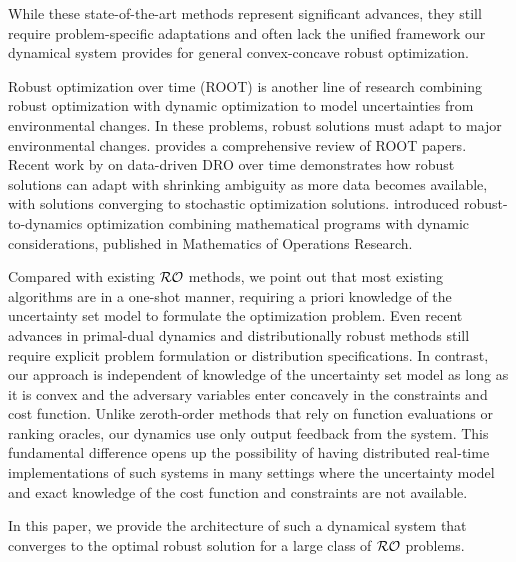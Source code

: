 \documentclass[journal,twoside,web]{ieeecolor}
\begin{document}
{While these state-of-the-art methods represent significant advances, they still require problem-specific adaptations and often lack the unified framework our dynamical system provides for general convex-concave robust optimization.}

{\color{blue} Robust optimization over time (ROOT) is another line of research combining robust optimization with dynamic optimization to model uncertainties from environmental changes. In these problems, robust solutions must adapt to major environmental changes. \cite{yazdani2023} provides a comprehensive review of ROOT papers. Recent work by \cite{aigner2023} on data-driven DRO over time demonstrates how robust solutions can adapt with shrinking ambiguity as more data becomes available, with solutions converging to stochastic optimization solutions. \cite{robusttodynamics2024} introduced robust-to-dynamics optimization combining mathematical programs with dynamic considerations, published in Mathematics of Operations Research.}

{\color{blue} Compared with existing ${\cal RO}$ methods, we point out that most existing algorithms are in a one-shot manner, requiring a priori knowledge of the uncertainty set model to formulate the optimization problem. Even recent advances in primal-dual dynamics \cite{timerescaling2023,pddamping2023} and distributionally robust methods \cite{aigner2023,drago2024} still require explicit problem formulation or distribution specifications. In contrast, our approach is independent of knowledge of the uncertainty set model as long as it is convex and the adversary variables enter concavely in the constraints and cost function. Unlike zeroth-order methods \cite{zoranksg2023,zoro2023} that rely on function evaluations or ranking oracles, our dynamics use only output feedback from the system. This fundamental difference opens up the possibility of having distributed real-time implementations of such systems in many settings where the uncertainty model and exact knowledge of the cost function and constraints are not available.}

In this paper, we provide the architecture of such a dynamical system that converges to the optimal robust solution for a large class of ${\cal RO}$ problems.
\end{document}
